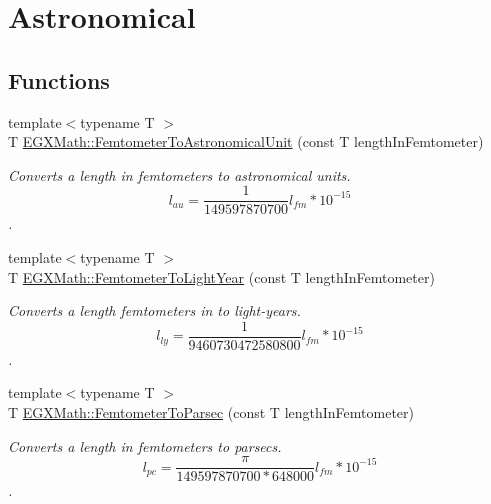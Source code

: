 \hypertarget{group___e_g_x_math-_conversions-_length_conversions-_femtometer-_astronomical}{}\section{Astronomical}
\label{group___e_g_x_math-_conversions-_length_conversions-_femtometer-_astronomical}
\subsection*{Functions}
\begin{DoxyCompactItemize}
\item 
{\footnotesize template$<$typename T $>$ }\\T \mbox{\hyperlink{group___e_g_x_math-_conversions-_length_conversions-_femtometer-_astronomical_ga9c379bc2a0ed6ff83f0d545bab48e909}{E\+G\+X\+Math\+::\+Femtometer\+To\+Astronomical\+Unit}} (const T length\+In\+Femtometer)
\begin{DoxyCompactList}\small\item\em Converts a length in femtometers to astronomical units. \[ l_{au}= \frac{1}{149597870700} l_{fm} * 10^{-15} \]. \end{DoxyCompactList}\item 
{\footnotesize template$<$typename T $>$ }\\T \mbox{\hyperlink{group___e_g_x_math-_conversions-_length_conversions-_femtometer-_astronomical_gaae002ed0894f79e0fa6889732d52e01d}{E\+G\+X\+Math\+::\+Femtometer\+To\+Light\+Year}} (const T length\+In\+Femtometer)
\begin{DoxyCompactList}\small\item\em Converts a length femtometers in to light-\/years. \[ l_{ly}= \frac{1}{9460730472580800} l_{fm} * 10^{-15} \]. \end{DoxyCompactList}\item 
{\footnotesize template$<$typename T $>$ }\\T \mbox{\hyperlink{group___e_g_x_math-_conversions-_length_conversions-_femtometer-_astronomical_ga40144bb4cb7d474b9a22394a0f321faa}{E\+G\+X\+Math\+::\+Femtometer\+To\+Parsec}} (const T length\+In\+Femtometer)
\begin{DoxyCompactList}\small\item\em Converts a length in femtometers to parsecs. \[ l_{pc}=\frac{\pi}{149597870700 * 648000} l_{fm} * 10^{-15} \]. \end{DoxyCompactList}\end{DoxyCompactItemize}


